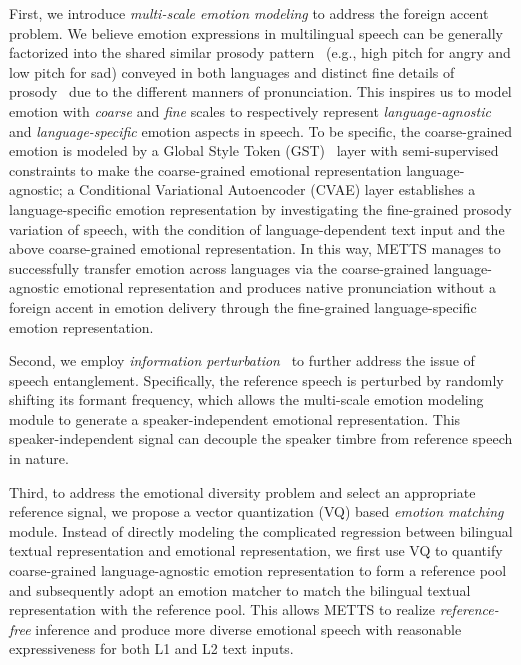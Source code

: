 \documentclass[journal,comsoc]{IEEEtran}
\begin{document}
First, we introduce \textit{multi-scale emotion modeling} to address the foreign accent problem. 
We believe emotion expressions in multilingual speech can be generally factorized into the shared similar prosody pattern~\cite{DBLP:conf/chi/DaiFM09, DBLP:conf/interspeech/SchullerMLR05} (e.g., high pitch for angry and low pitch for sad) conveyed in both languages and distinct fine details of prosody~\cite{DBLP:journals/ijst/KottiP12, DBLP:conf/mldm/FersiniMAA09} due to the different manners of pronunciation. %
This inspires us to model emotion with \textit{coarse} and \textit{fine} scales to respectively represent \textit{language-agnostic} and \textit{language-specific} emotion aspects in speech. To be specific, the coarse-grained emotion is modeled by a Global Style Token (GST)~\cite{DBLP:conf/icml/WangSZRBSXJRS18} layer with semi-supervised constraints to make the coarse-grained emotional representation language-agnostic; a Conditional Variational Autoencoder (CVAE) layer establishes a language-specific emotion representation by investigating the fine-grained prosody variation of speech, with the condition of language-dependent text input and the above coarse-grained emotional representation. In this way, METTS manages to successfully transfer emotion across languages via the coarse-grained language-agnostic emotional representation and produces native pronunciation without a foreign accent in emotion delivery through the fine-grained language-specific emotion representation. 

Second, we employ \textit{information perturbation}~\cite{DBLP:journals/spl/LeiYZXS22} to further address the issue of speech entanglement. Specifically, the reference speech is perturbed by randomly shifting its formant frequency, which allows the multi-scale emotion modeling module to generate a speaker-independent emotional representation. This speaker-independent signal can decouple the speaker timbre from reference speech in nature.

Third, to address the emotional diversity problem and select
an appropriate reference signal, we propose a vector quantization (VQ) based \textit{emotion matching} module. Instead of directly modeling the complicated regression between bilingual textual representation and emotional representation, we first use VQ to quantify coarse-grained language-agnostic emotion representation to form a reference pool and subsequently adopt an emotion matcher to match the bilingual textual representation with the reference pool. This allows METTS to realize \textit{reference-free} inference and produce more diverse emotional speech with reasonable expressiveness for both L1 and L2 text inputs.
\end{document}
